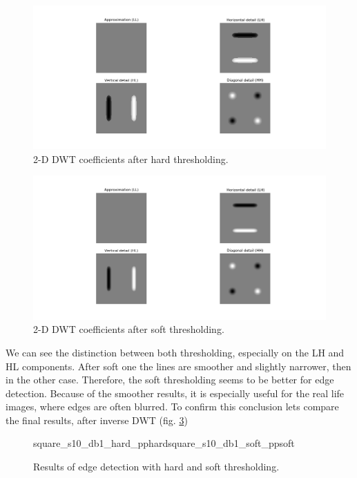 \begin{figure}[h]
	\centering
	\includegraphics[width=\textwidth]{graphs/square_s10_db1_hard_coeffs_d.png}
	\caption{2-D DWT coefficients after hard thresholding.}
	\label{fig:square_s10_hard_coeffs_d}
\end{figure}

\begin{figure}[h]
	\centering
	\includegraphics[width=\textwidth]{graphs/square_s10_db1_soft_coeffs_d.png}
	\caption{2-D DWT coefficients after soft thresholding.}
	\label{fig:square_s10_soft_coeffs_d}
\end{figure}

We can see the distinction between both thresholding, especially on the LH and HL components. After soft one the lines are smoother and slightly narrower, then in the other case. Therefore, the soft thresholding seems to be better for edge detection. Because of the smoother results, it is especially useful for the real life images, where edges are often blurred. To confirm this conclusion lets compare the final results, after inverse DWT (fig. \ref{fig:square_s10_idwt_pp})

\begin{figure}[h]
	\begin{subdiagrams2}{square_s10_db1_hard_pp}{hard}{square_s10_db1_soft_pp}{soft}
	\end{subdiagrams2}
	\centering
	\caption{Results of edge detection with hard and soft thresholding.}
	\label{fig:square_s10_idwt_pp}
\end{figure}

